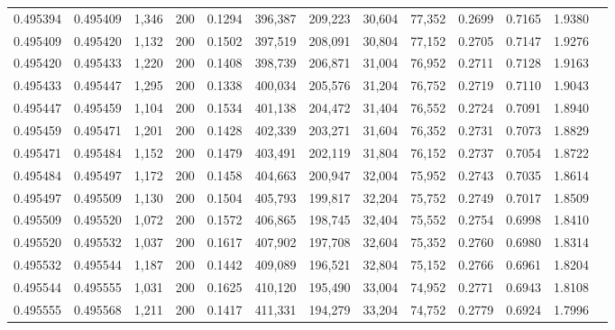 \begin{tabular}{rrrrrrrrrrrrr}
0.495394 & 0.495409 &  1,346 & 200 &                                     0.1294 & 396,387 & 209,223 &  30,604 &  77,352 & 0.2699 & 0.7165 & 1.9380 \\
0.495409 & 0.495420 &  1,132 & 200 &                                     0.1502 & 397,519 & 208,091 &  30,804 &  77,152 & 0.2705 & 0.7147 & 1.9276 \\
0.495420 & 0.495433 &  1,220 & 200 &                                     0.1408 & 398,739 & 206,871 &  31,004 &  76,952 & 0.2711 & 0.7128 & 1.9163 \\
0.495433 & 0.495447 &  1,295 & 200 &                                     0.1338 & 400,034 & 205,576 &  31,204 &  76,752 & 0.2719 & 0.7110 & 1.9043 \\
0.495447 & 0.495459 &  1,104 & 200 &                                     0.1534 & 401,138 & 204,472 &  31,404 &  76,552 & 0.2724 & 0.7091 & 1.8940 \\
0.495459 & 0.495471 &  1,201 & 200 &                                     0.1428 & 402,339 & 203,271 &  31,604 &  76,352 & 0.2731 & 0.7073 & 1.8829 \\
0.495471 & 0.495484 &  1,152 & 200 &                                     0.1479 & 403,491 & 202,119 &  31,804 &  76,152 & 0.2737 & 0.7054 & 1.8722 \\
0.495484 & 0.495497 &  1,172 & 200 &                                     0.1458 & 404,663 & 200,947 &  32,004 &  75,952 & 0.2743 & 0.7035 & 1.8614 \\
0.495497 & 0.495509 &  1,130 & 200 &                                     0.1504 & 405,793 & 199,817 &  32,204 &  75,752 & 0.2749 & 0.7017 & 1.8509 \\
0.495509 & 0.495520 &  1,072 & 200 &                                     0.1572 & 406,865 & 198,745 &  32,404 &  75,552 & 0.2754 & 0.6998 & 1.8410 \\
0.495520 & 0.495532 &  1,037 & 200 &                                     0.1617 & 407,902 & 197,708 &  32,604 &  75,352 & 0.2760 & 0.6980 & 1.8314 \\
0.495532 & 0.495544 &  1,187 & 200 &                                     0.1442 & 409,089 & 196,521 &  32,804 &  75,152 & 0.2766 & 0.6961 & 1.8204 \\
0.495544 & 0.495555 &  1,031 & 200 &                                     0.1625 & 410,120 & 195,490 &  33,004 &  74,952 & 0.2771 & 0.6943 & 1.8108 \\
0.495555 & 0.495568 &  1,211 & 200 &                                     0.1417 & 411,331 & 194,279 &  33,204 &  74,752 & 0.2779 & 0.6924 & 1.7996 \\

\end{tabular}
